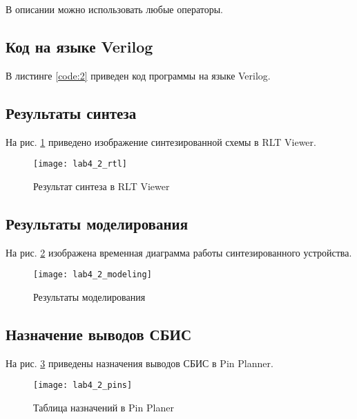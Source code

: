 В описании можно использовать любые операторы.

\newpage

\subsection{Код на языке Verilog}

В листинге \ref{code:2} приведен код программы на языке Verilog.


\vspace{-0.5cm}

\subsection{Результаты синтеза}

На рис. \ref{fig:lab4_2_rtl} приведено изображение синтезированной схемы в RLT Viewer.

\begin{figure}[H]
\begin{center}
	\texttt{[image: lab4\_2\_rtl]}
	\caption{Результат синтеза в RLT Viewer}
	\label{fig:lab4_2_rtl}
\end{center}
\end{figure}

\subsection{Результаты моделирования}
\label{sec:lab4_2_modeling}

На рис. \ref{fig:lab4_2_modeling} изображена временная диаграмма работы синтезированного устройства.

\begin{figure}[H]
\begin{center}
	\texttt{[image: lab4\_2\_modeling]}
	\caption{Результаты моделирования}
	\label{fig:lab4_2_modeling}
\end{center}
\end{figure}

\subsection{Назначение выводов СБИС}

На рис. \ref{fig:lab4_2_pins} приведены назначения выводов СБИС в Pin Planner.

\begin{figure}[H]
\begin{center}
	\texttt{[image: lab4\_2\_pins]}
	\caption{Таблица назначений в Pin Planer}
	\label{fig:lab4_2_pins}
\end{center}
\end{figure}

